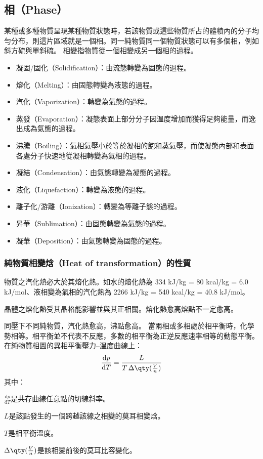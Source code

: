 \documentclass[a4paper,12pt]{report}
\begin{document}
\subsection{相（Phase）}
某種或多種物質呈現某種物質狀態時，若該物質或這些物質所占的體積內的分子均勻分布，則這片區域就是一個相。同一純物質同一個物質狀態可以有多個相，例如斜方硫與單斜硫。
相變指物質從一個相變成另一個相的過程。
\begin{itemize}
  \item 凝固/固化（Solidification）：由流態轉變為固態的過程。
  \item 熔化（Melting）：由固態轉變為液態的過程。
  \item 汽化（Vaporization）：轉變為氣態的過程。
  \item 蒸發（Evaporation）：凝態表面上部分分子因溫度增加而獲得足夠能量，而逸出成為氣態的過程。
  \item 沸騰（Boiling）：氣相氣壓小於等於凝相的飽和蒸氣壓，而使凝態內部和表面各處分子快速地從凝相轉變為氣相的過程。
  \item 凝結（Condensation）：由氣態轉變為凝態的過程。
  \item 液化（Liquefaction）：轉變為液態的過程。
  \item 離子化/游離（Ionization）：轉變為等離子態的過程。
  \item 昇華（Sublimation）：由固態轉變為氣態的過程。
  \item 凝華（Deposition）：由氣態轉變為固態的過程。
\end{itemize}
\subsubsection{純物質相變焓（Heat of transformation）的性質}
\bit
\item 物質之汽化熱必大於其熔化熱。如水的熔化熱為 334 kJ/kg = 80 kcal/kg = 6.0 kJ/mol、液相變為氣相的汽化熱為 2266 kJ/kg = 540 kcal/kg = 40.8 kJ/mol。
\item 晶體之熔化熱受其晶格能影響並與其正相關。熔化熱愈高熔點不一定愈高。
\item 同壓下不同純物質，汽化熱愈高，沸點愈高。
\eit
{}
當兩相或多相處於相平衡時，化學勢相等。相平衡並不代表不反應，多數的相平衡為正逆反應速率相等的動態平衡。
在純物質相圖的異相平衡壓力–溫度曲線上：
\[\frac{\mathrm{d}p}{\mathrm{d}T}=\frac{L}{T\,\Delta\qty(\frac{V}{n})}\]
其中：
\bit
\item $\frac{\mathrm{d}p}{\mathrm{d}T}$是共存曲線任意點的切線斜率。
\item $L$是該點發生的一個跨越該線之相變的莫耳相變焓。
\item $T$是相平衡溫度。
\item $\Delta\qty(\frac{V}{n})$是該相變前後的莫耳比容變化。
\eit
\end{document}
